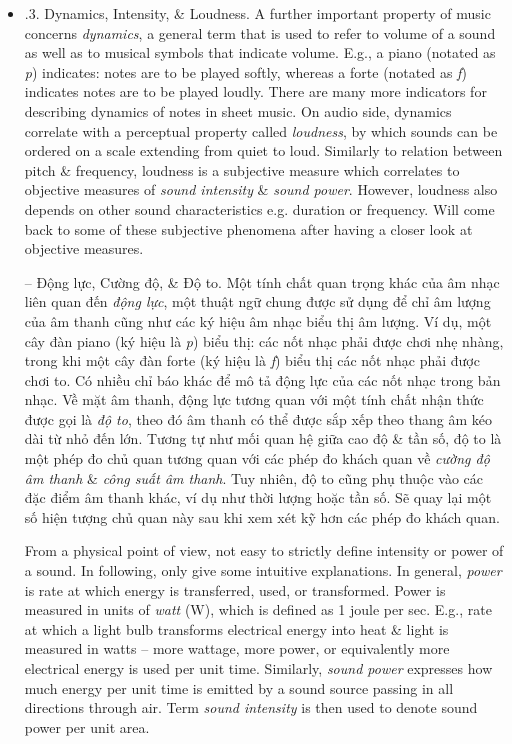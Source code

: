 \documentclass{article}
\begin{document}
\begin{itemize}
\begin{itemize}
\begin{itemize}
			\item {.3. Dynamics, Intensity, \& Loudness.} A further important property of music concerns {\it dynamics}, a general term that is used to refer to volume of a sound as well as to musical symbols that indicate volume. E.g., a piano (notated as {\it p}) indicates: notes are to be played softly, whereas a forte (notated as {\it f}) indicates notes are to be played loudly. There are many more indicators for describing dynamics of notes in sheet music. On audio side, dynamics correlate with a perceptual property called {\it loudness}, by which sounds can be ordered on a scale extending from quiet to loud. Similarly to relation between pitch \& frequency, loudness is a subjective measure which correlates to objective measures of {\it sound intensity} \& {\it sound power}. However, loudness also depends on other sound characteristics e.g. duration or frequency. Will come back to some of these subjective phenomena after having a closer look at objective measures.
			
			-- {\sf Động lực, Cường độ, \& Độ to.} Một tính chất quan trọng khác của âm nhạc liên quan đến {\it động lực}, một thuật ngữ chung được sử dụng để chỉ âm lượng của âm thanh cũng như các ký hiệu âm nhạc biểu thị âm lượng. Ví dụ, một cây đàn piano (ký hiệu là {\it p}) biểu thị: các nốt nhạc phải được chơi nhẹ nhàng, trong khi một cây đàn forte (ký hiệu là {\it f}) biểu thị các nốt nhạc phải được chơi to. Có nhiều chỉ báo khác để mô tả động lực của các nốt nhạc trong bản nhạc. Về mặt âm thanh, động lực tương quan với một tính chất nhận thức được gọi là {\it độ to}, theo đó âm thanh có thể được sắp xếp theo thang âm kéo dài từ nhỏ đến lớn. Tương tự như mối quan hệ giữa cao độ \& tần số, độ to là một phép đo chủ quan tương quan với các phép đo khách quan về {\it cường độ âm thanh} \& {\it công suất âm thanh}. Tuy nhiên, độ to cũng phụ thuộc vào các đặc điểm âm thanh khác, ví dụ như thời lượng hoặc tần số. Sẽ quay lại một số hiện tượng chủ quan này sau khi xem xét kỹ hơn các phép đo khách quan.
			
			From a physical point of view, not easy to strictly define intensity or power of a sound. In following, only give some intuitive explanations. In general, {\it power} is rate at which energy is transferred, used, or transformed. Power is measured in units of {\it watt} (W), which is defined as 1 joule per sec. E.g., rate at which a light bulb transforms electrical energy into heat \& light is measured in watts -- more wattage, more power, or equivalently more electrical energy is used per unit time. Similarly, {\it sound power} expresses how much energy per unit time is emitted by a sound source passing in all directions through air. Term {\it sound intensity} is then used to denote sound power per unit area.
			

\end{itemize}
\end{itemize}
\end{itemize}
\end{document}
